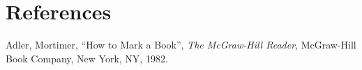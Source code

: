 









\filbreak
\section*{References}


\noindent
Adler, Mortimer, ``How to Mark a Book'', \textit{The McGraw-Hill Reader}, McGraw-Hill Book Company, New York, NY, 1982.

















\appendix











